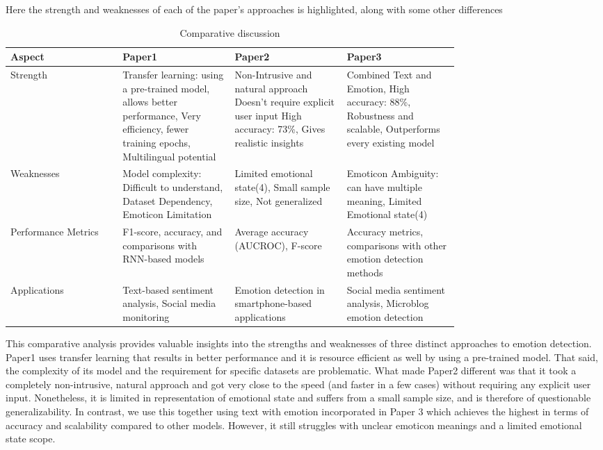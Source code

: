 \documentclass[12pt]{article} %
\begin{document}
Here the strength and weaknesses of each of the paper's approaches is highlighted, along with some other differences
\begin{table}[h!]
  \centering
    \caption{Comparative discussion}
  \begin{tabular}{|l|p{0.25\linewidth}|p{0.25\linewidth}|p{0.25\linewidth}|}
    \hline
    \textbf{Aspect} & \textbf{Paper1} & \textbf{Paper2} & \textbf{Paper3} \\ 
    \hline
    Strength & Transfer learning: using a pre-trained model, allows better performance, Very efficiency, fewer training epochs, Multilingual potential & Non-Intrusive and natural approach Doesn't require explicit user input High accuracy: 73\%, Gives realistic insights & Combined Text and Emotion, High accuracy: 88\%, Robustness and scalable, Outperforms every existing model\\
    \hline                    
  Weaknesses & Model complexity: Difficult to understand, Dataset Dependency, Emoticon Limitation & Limited emotional state(4), Small sample size, Not generalized & Emoticon Ambiguity: can have multiple meaning, Limited Emotional state(4) \\
   \hline
   Performance Metrics & F1-score, accuracy, and comparisons with RNN-based models & Average accuracy (AUCROC), F-score & Accuracy metrics, comparisons with other emotion detection methods \\
\hline
Applications & Text-based sentiment analysis, Social media monitoring & Emotion detection in smartphone-based applications & Social media sentiment analysis, Microblog emotion detection\\
    \hline
  \end{tabular}                                                                                   
  
  \label{tab:my_label}
\end{table}

This comparative analysis provides valuable insights into the strengths and weaknesses of three distinct approaches to emotion detection. Paper1 uses transfer learning that results in better performance and it is resource efficient as well by using a pre-trained model. That said, the complexity of its model and the requirement for specific datasets are problematic. What made Paper2 different was that it took a completely non-intrusive, natural approach and got very close to the speed (and faster in a few cases) without requiring any explicit user input. Nonetheless, it is limited in representation of emotional state and suffers from a small sample size, and is therefore of questionable generalizability. In contrast, we use this together using text with emotion incorporated in Paper 3 which achieves the highest in terms of accuracy and scalability compared to other models. However, it still struggles with unclear emoticon meanings and a limited emotional state scope.
\end{document}
